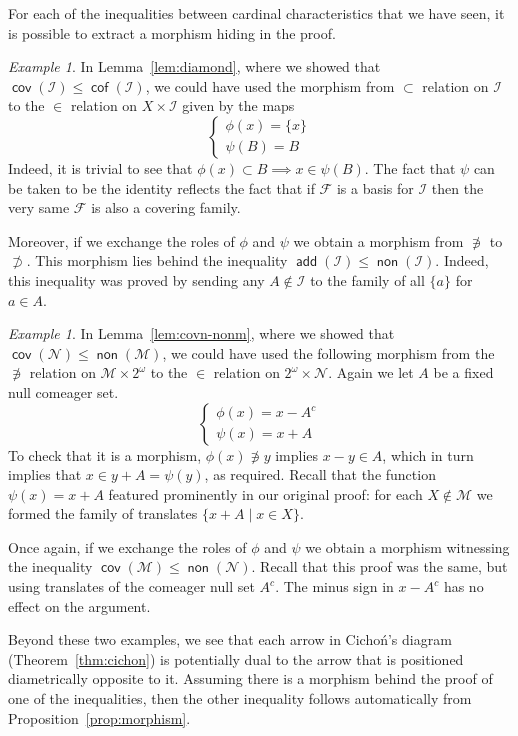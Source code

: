 \documentclass[11pt,oneside]{amsbook}
\newcommand{\Null}{\mathcal N}
\newcommand{\Meager}{\mathcal M}
\DeclareMathOperator{\add}{\mathsf{add}}
\DeclareMathOperator{\non}{\mathsf{non}}
\DeclareMathOperator{\cov}{\mathsf{cov}}
\DeclareMathOperator{\cof}{\mathsf{cof}}
\theoremstyle{definition}
\theoremstyle{plain}
\theoremstyle{definition}
\theoremstyle{remark}
\newtheorem{example}[thm]{Example}
\begin{document}
For each of the inequalities between cardinal characteristics that we have seen, it is possible to extract a morphism hiding in the proof. 

\begin{example}
  In Lemma~\ref{lem:diamond}, where we showed that $\cov(\mathcal I)\leq\cof(\mathcal I)$, we could have used the morphism from $\subset$ relation on $\mathcal I$ to the $\in$ relation on $X\times\mathcal I$ given by the maps
  \[\begin{cases}\phi(x)=\{x\}\\\psi(B)=B\end{cases}
  \]
  Indeed, it is trivial to see that $\phi(x)\subset B\implies x\in\psi(B)$. The fact that $\psi$ can be taken to be the identity reflects the fact that if $\mathcal F$ is a basis for $\mathcal I$ then the very same $\mathcal F$ is also a covering family.

  Moreover, if we exchange the roles of $\phi$ and $\psi$ we obtain a morphism from $\not\ni$ to $\not\supset$. This morphism lies behind the inequality $\add(\mathcal I)\leq\non(\mathcal I)$. Indeed, this inequality was proved by sending any $A\notin\mathcal I$ to the family of all $\{a\}$ for $a\in A$.
\end{example}

\begin{example}
  In Lemma~\ref{lem:covn-nonm}, where we showed that $\cov(\Null)\leq\non(\Meager)$, we could have used the following morphism from the $\not\ni$ relation on $\Meager\times2^\omega$ to the $\in$ relation on $2^\omega\times\Null$. Again we let $A$ be a fixed null comeager set.
  \[\begin{cases}\phi(x)=x-A^c\\\psi(x)=x+A\end{cases}
  \]
  To check that it is a morphism, $\phi(x)\not\ni y$ implies $x-y\in A$, which in turn implies that $x\in y+A=\psi(y)$, as required. Recall that the function $\psi(x)=x+A$ featured prominently in our original proof: for each $X\notin\Meager$ we formed the family of translates $\{x+A\mid x\in X\}$.
  
  Once again, if we exchange the roles of $\phi$ and $\psi$ we obtain a morphism witnessing the inequality $\cov(\Meager)\leq\non(\Null)$. Recall that this proof was the same, but using translates of the comeager null set $A^c$. The minus sign in $x-A^c$ has no effect on the argument.
\end{example}

Beyond these two examples, we see that each arrow in Cicho\'n's diagram (Theorem~\ref{thm:cichon}) is potentially dual to the arrow that is positioned diametrically opposite to it. Assuming there is a morphism behind the proof of one of the inequalities, then the other inequality follows automatically from Proposition~\ref{prop:morphism}.
\end{document}
